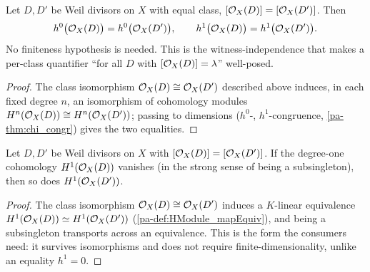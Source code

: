 \begin{theorem}
  \label{pa-thm:h0h1_divisorSheaf_class}
  \leanok

  Let \(D, D'\) be Weil divisors on \(X\) with equal class, \([\mathcal{O}_{X}(D)] = [\mathcal{O}_{X}(D')]\). Then
  \[
    h^0\bigl(\mathcal{O}_{X}(D)\bigr) = h^0\bigl(\mathcal{O}_{X}(D')\bigr), \qquad
    h^1\bigl(\mathcal{O}_{X}(D)\bigr) = h^1\bigl(\mathcal{O}_{X}(D')\bigr).
  \]
  No finiteness hypothesis is needed. This is the witness-independence that makes a per-class
  quantifier ``for all \(D\) with \([\mathcal{O}_{X}(D)] = \lambda\)'' well-posed.
\end{theorem}
\begin{proof}
  \leanok
  The class isomorphism \(\mathcal{O}_{X}(D) \cong \mathcal{O}_{X}(D')\) described above induces, in each
  fixed degree \(n\), an isomorphism of cohomology modules \(H^n(\mathcal{O}_{X}(D)) \cong
  H^n(\mathcal{O}_{X}(D'))\); passing to dimensions (\(h^0\)-, \(h^1\)-congruence,
  \ref{pa-thm:chi_congr}) gives the two equalities.
\end{proof}

\begin{theorem}
  \label{pa-thm:subsingleton_hModule_one_class}
  \leanok

  Let \(D, D'\) be Weil divisors on \(X\) with \([\mathcal{O}_{X}(D)] = [\mathcal{O}_{X}(D')]\). If the
  degree-one cohomology \(H^1(\mathcal{O}_{X}(D))\) vanishes (in the strong sense of being a
  subsingleton), then so does \(H^1(\mathcal{O}_{X}(D'))\).
\end{theorem}
\begin{proof}
  \leanok
  The class isomorphism \(\mathcal{O}_{X}(D) \cong \mathcal{O}_{X}(D')\) induces a \(K\)-linear equivalence
  \(H^1(\mathcal{O}_{X}(D)) \simeq H^1(\mathcal{O}_{X}(D'))\) (\ref{pa-def:HModule_mapEquiv}), and being a
  subsingleton transports across an equivalence. This is the form the consumers need: it
  survives isomorphisms and does not require finite-dimensionality, unlike an equality
  \(h^1 = 0\).
\end{proof}


